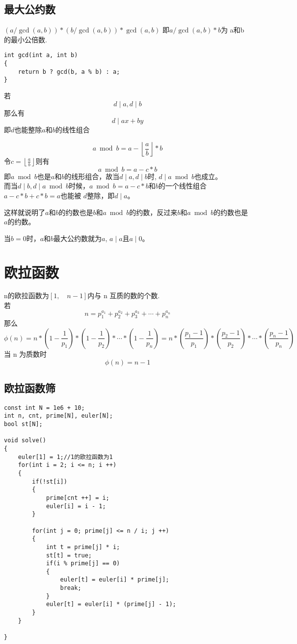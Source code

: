 \documentclass[]{book}
\begin{document}
\section{最大公约数}
$(a / \gcd(a, b)) * (b / \gcd(a, b))* \gcd(a, b)$ 即$a / \gcd(a, b) * b$为 a和b 的最小公倍数.
\begin{lstlisting}
int gcd(int a, int b)
{
    return b ? gcd(b, a % b) : a;
}
\end{lstlisting}
若
\[d \mid a, d \mid b\]
那么有
\[d \mid ax + by\]
即$d$也能整除$a$和$b$的线性组合

\[a \bmod b = a - \left\lfloor \frac{a}{b}\right\rfloor * b\]
令$c = \left\lfloor \frac{a}{b}\right\rfloor$则有
\[a \bmod b = a - c * b\]
即$a\bmod b$也是$a$和$b$的线形组合，故当$d\mid a, d\mid b$时, $d \mid a \bmod b$也成立。\\
而当$d\mid b, d\mid a\bmod b$时候，$a\bmod b = a - c * b$和$b$的一个线性组合$a - c*b + c * b = a$也能被 $d$整除，即$d\mid a$。

这样就说明了$a$和$b$的约数也是$b$和$a\bmod b$的约数，反过来$b$和$a\bmod b$的约数也是$a$的约数。

当$b=0$时，$a$和$b$最大公约数就为$a$, $a \mid a$且$a \mid 0$。
\chapter{欧拉函数}
n的欧拉函数为$[1,\quad n - 1]$内与 n 互质的数的个数.\\
若 
\[n = p_{1}^{a_{1}} + p_{2}^{a_{2}} + p_{3}^{a_{3}} +\cdots + p_{n}^{a_{n}}\]
那么
\[\phi(n) = n * (1 - \frac{1}{p_{1}}) * (1 - \frac{1}{p_{2}}) *\cdots* (1 - \frac{1}{p_{n}}) = 
n*(\frac{p_{1} - 1}{p_{1}})*(\frac{p_{2} - 1}{p_{2}})*\cdots *(\frac{p_{n} - 1}{p_{n}})\]
当 n 为质数时
\[\phi(n) = n - 1\]

\section{欧拉函数筛}
\begin{lstlisting}
const int N = 1e6 + 10;
int n, cnt, prime[N], euler[N];
bool st[N];

void solve()
{
    euler[1] = 1;//1的欧拉函数为1
    for(int i = 2; i <= n; i ++)
    {
        if(!st[i])
        {
            prime[cnt ++] = i;
            euler[i] = i - 1;
        }
        
        for(int j = 0; prime[j] <= n / i; j ++)
        {
            int t = prime[j] * i;
            st[t] = true;
            if(i % prime[j] == 0)
            {
                euler[t] = euler[i] * prime[j];
                break;
            }
            euler[t] = euler[i] * (prime[j] - 1);
        }
    }
 
}
\end{lstlisting}
\end{document}
